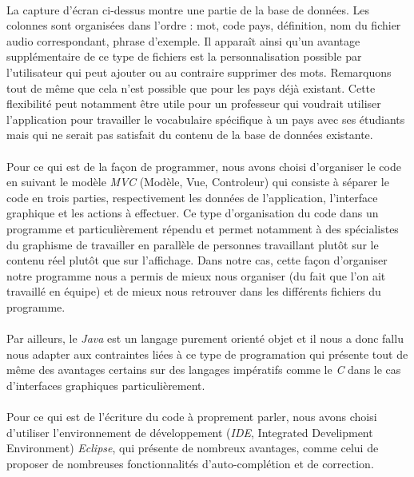 \documentclass[11pt, a4paper]{report}
\begin{document}
\paragraph{}La capture d'écran ci-dessus montre une partie de la base de données. Les colonnes sont organisées dans l'ordre : mot, code pays, définition, nom du fichier audio correspondant, phrase d'exemple. Il apparaît ainsi qu'un avantage supplémentaire de ce type de fichiers est la personnalisation possible par l'utilisateur qui peut ajouter ou au contraire supprimer des mots. Remarquons tout de même que cela n'est possible que pour les pays déjà existant. Cette flexibilité peut notamment être utile pour un professeur qui voudrait utiliser l'application pour travailler le vocabulaire spécifique à un pays avec ses étudiants mais qui ne serait pas satisfait du contenu de la base de données existante.

\paragraph{}Pour ce qui est de la façon de  programmer, nous avons choisi d'organiser le code en suivant le modèle \textit{MVC} (Modèle, Vue, Controleur) qui consiste à séparer le code en trois parties, respectivement les données de l'application, l'interface graphique et les actions à effectuer. Ce type d'organisation du code dans un programme et particulièrement répendu et permet notamment à des spécialistes du graphisme de travailler en parallèle de personnes travaillant plutôt sur le contenu réel plutôt que sur l'affichage. Dans notre cas, cette façon d'organiser notre programme nous a permis de mieux nous organiser (du fait que l'on ait travaillé en équipe) et de mieux nous retrouver dans les différents fichiers du programme.

\paragraph{}Par ailleurs, le \textit{Java} est un langage purement orienté objet et il nous a donc fallu nous adapter aux contraintes liées à ce type de programation qui présente tout de même des avantages certains sur des langages impératifs comme le \textit{C} dans le cas d'interfaces graphiques particulièrement.

\paragraph{}Pour ce qui est de l'écriture du code à proprement parler, nous avons choisi d'utiliser l'environnement de développement (\textit{IDE}, Integrated Develipment Environment) \textit{Eclipse}, qui présente de nombreux avantages, comme celui de proposer de nombreuses fonctionnalités d'auto-complétion et de correction.
\end{document}
